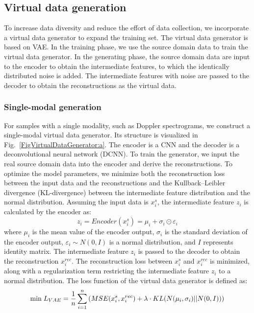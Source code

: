 \documentclass[journal]{IEEEtran}
\begin{document}
\subsection{Virtual data generation}
To increase data diversity and reduce the effort of data collection, we incorporate a virtual data generator to expand the training set. The virtual data generator is based on VAE. In the training phase, we use the source domain data to train the virtual data generator. In the generating phase, the source domain data are input to the encoder to obtain the intermediate features, to which the identically distributed noise is added. The intermediate features with noise are passed to the decoder to obtain the reconstructions as the virtual data. 

\subsubsection{Single-modal generation}
For samples with a single modality, such as Doppler spectrograms, we construct a single-modal virtual data generator. Its structure is visualized in Fig.~\ref{FigVirtualDataGenerator:a}. The encoder is a CNN and the decoder is a deconvolutional neural network (DCNN). To train the generator, we input the real source domain data into the encoder and derive the reconstructions. To optimize the model parameters, we minimize both the reconstruction loss between the input data and the reconstructions and the Kullback–Leibler divergence (KL-divergence) between the intermediate feature distribution and the normal distribution. Assuming the input data is $x_{i}^{s}$, the intermediate feature $z_i$ is calculated by the encoder as:
\begin{equation}
    z_i = Encoder(x_i^s) = \mu_i + \sigma_i \odot \varepsilon_i 
\end{equation}
where $\mu_i$ is the mean value of the encoder output, $\sigma_i$ is the standard deviation of the encoder output, $\varepsilon_i \sim N(0,I)$ is a normal distribution, and $I$ represents identity matrix. The intermediate feature $z_i$ is passed to the decoder to obtain the reconstruction $x _{i}^{rec}$. The reconstruction loss between $x_{i}^{s}$ and $x _{i}^{rec}$ is minimized, along with a regularization term restricting the intermediate feature $z_i$ to a normal distribution. The loss function of the virtual data generator is defined as:
\begin{equation}
\footnotesize
	{\rm min}\ L_{VAE} = \frac{1}{n}\sum_{i=1}^{n} \left( MSE(x_{i}^{s}, x_{i}^{rec}) + \lambda \cdot KL(N(\mu_i,\sigma_i)||N(0,I)) \right) 
\end{equation}
\end{document}
